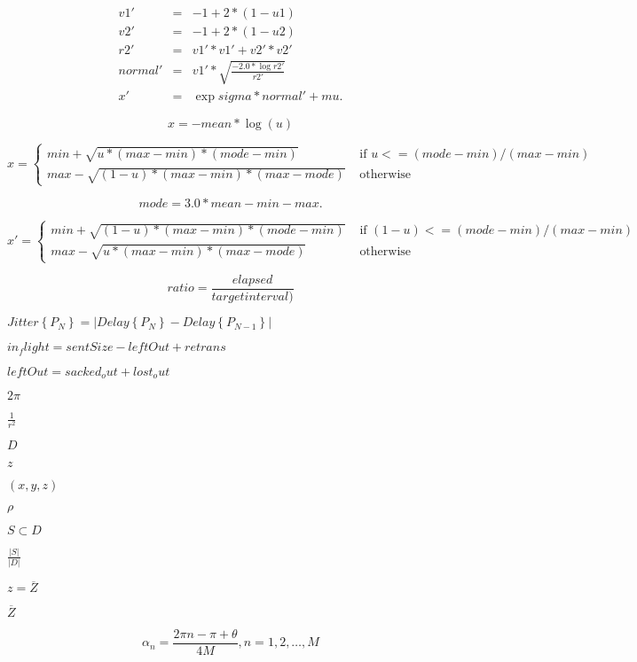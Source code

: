 \documentclass{article}
\begin{document}
\begin{eqnarray*} v1' & = & -1 + 2 * (1 - u1) \\ v2' & = & -1 + 2 * (1 - u2) \\ r2' & = & v1' * v1' + v2' * v2' \\ normal' & = & v1' * \sqrt{\frac{-2.0 * \log{r2'}}{r2'}} \\ x' & = & \exp{sigma * normal' + mu} . \end{eqnarray*}
\pagebreak

\[ x = - mean * \log(u) \]
\pagebreak

\[ x = \left\{ \begin{array}{rl} min + \sqrt{u * (max - min) * (mode - min)} &\mbox{ if $u <= (mode - min)/(max - min)$} \\ max - \sqrt{ (1 - u) * (max - min) * (max - mode) } &\mbox{ otherwise} \end{array} \right. \]
\pagebreak

\[ mode = 3.0 * mean - min - max . \]
\pagebreak

\[ x' = \left\{ \begin{array}{rl} min + \sqrt{(1 - u) * (max - min) * (mode - min)} &\mbox{ if $(1 - u) <= (mode - min)/(max - min)$} \\ max - \sqrt{ u * (max - min) * (max - mode) } &\mbox{ otherwise} \end{array} \right. \]
\pagebreak

\[ ratio = \frac{elapsed}{target interval)} \]
\pagebreak

$Jitter\left\{P_N\right\} = \left|Delay\left\{P_N\right\} - Delay\left\{P_{N-1}\right\}\right|$
\pagebreak

$in_flight = sentSize - leftOut + retrans$
\pagebreak

$leftOut = sacked_out + lost_out$
\pagebreak

$2 \pi$
\pagebreak

$\frac{1}{r^2}$
\pagebreak

$ D $
\pagebreak

$ z$
\pagebreak

$ (x,y,z) $
\pagebreak

$ \rho $
\pagebreak

$ S \subset D $
\pagebreak

$ \frac{|S|}{|D|} $
\pagebreak

$ z=\overline{Z} $
\pagebreak

$ \overline{Z} $
\pagebreak

\[ \alpha_n = \frac{2\pi n - \pi + \theta}{4M}, n=1,2, \ldots,M\]
\pagebreak
\end{document}
